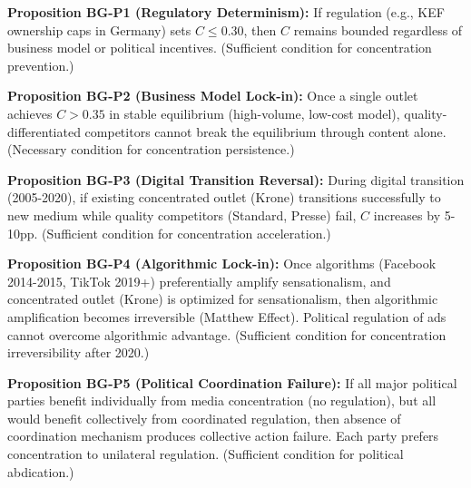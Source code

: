 \textbf{Proposition BG-P1 (Regulatory Determinism):}
If regulation (e.g., KEF ownership caps in Germany) sets $C \leq 0.30$, then $C$ remains bounded
regardless of business model or political incentives. (Sufficient condition for concentration prevention.)

\textbf{Proposition BG-P2 (Business Model Lock-in):}
Once a single outlet achieves $C > 0.35$ in stable equilibrium (high-volume, low-cost model),
quality-differentiated competitors cannot break the equilibrium through content alone.
(Necessary condition for concentration persistence.)

\textbf{Proposition BG-P3 (Digital Transition Reversal):}
During digital transition (2005-2020), if existing concentrated outlet (Krone) transitions successfully
to new medium while quality competitors (Standard, Presse) fail, $C$ increases by 5-10pp.
(Sufficient condition for concentration acceleration.)

\textbf{Proposition BG-P4 (Algorithmic Lock-in):}
Once algorithms (Facebook 2014-2015, TikTok 2019+) preferentially amplify sensationalism,
and concentrated outlet (Krone) is optimized for sensationalism, then algorithmic amplification
becomes irreversible (Matthew Effect). Political regulation of ads cannot overcome algorithmic advantage.
(Sufficient condition for concentration irreversibility after 2020.)

\textbf{Proposition BG-P5 (Political Coordination Failure):}
If all major political parties benefit individually from media concentration (no regulation),
but all would benefit collectively from coordinated regulation, then absence of coordination mechanism
produces collective action failure. Each party prefers concentration to unilateral regulation.
(Sufficient condition for political abdication.)

